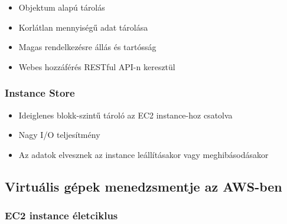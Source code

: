 \documentclass[a4paper,12pt]{article}
\begin{document}
    \begin{itemize}
        \item Objektum alapú tárolás
        \item Korlátlan mennyiségű adat tárolása
        \item Magas rendelkezésre állás és tartósság
        \item Webes hozzáférés RESTful API-n keresztül
    \end{itemize}

    \subsubsection{Instance Store}

    \begin{itemize}
        \item Ideiglenes blokk-szintű tároló az EC2 instance-hoz csatolva
        \item Nagy I/O teljesítmény
        \item Az adatok elvesznek az instance leállításakor vagy meghibásodásakor
    \end{itemize}

    \subsection{Virtuális gépek menedzsmentje az AWS-ben}

    \subsubsection{EC2 instance életciklus}
\end{document}
